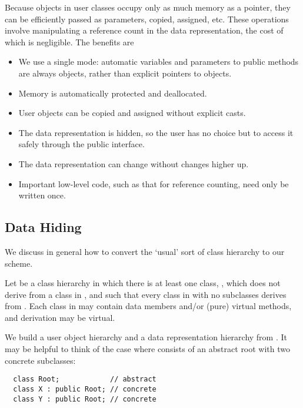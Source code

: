 Because objects in user classes occupy only as much memory as a
pointer, they can be efficiently passed as parameters, copied,
assigned, etc.  These operations involve manipulating a reference
count in the data representation, the cost of which is negligible.
The benefits are

\begin{itemize}
\item
We use a single mode: automatic variables and parameters to public
methods are always objects, rather than explicit pointers to objects.

\item
Memory is automatically protected and deallocated.

\item
User objects can be copied and assigned without explicit casts.

\item
The data representation is hidden, so the user has no choice
but to access it safely through the public interface.

\item
The data representation can change without changes higher up.

\item
Important low-level code, such as that for reference counting, need only
be written once.

\end{itemize}

\subsection{Data Hiding}

We discuss in general how to convert the `usual' sort of class
hierarchy to our scheme.

Let  be a class hierarchy in which there is at least one
class, , which does not derive from a class in ,
and such that every class in  with no subclasses derives from
. Each class in  may contain data members and/or
(pure) virtual methods, and derivation may be virtual.

We build a user object hierarchy  and a data representation
hierarchy  from . It may be helpful to think of the
case where  consists of an abstract root with two concrete
subclasses:

\lskip
\begin{verbatim}
  class Root;            // abstract
  class X : public Root; // concrete
  class Y : public Root; // concrete
\end{verbatim}
\lskip

